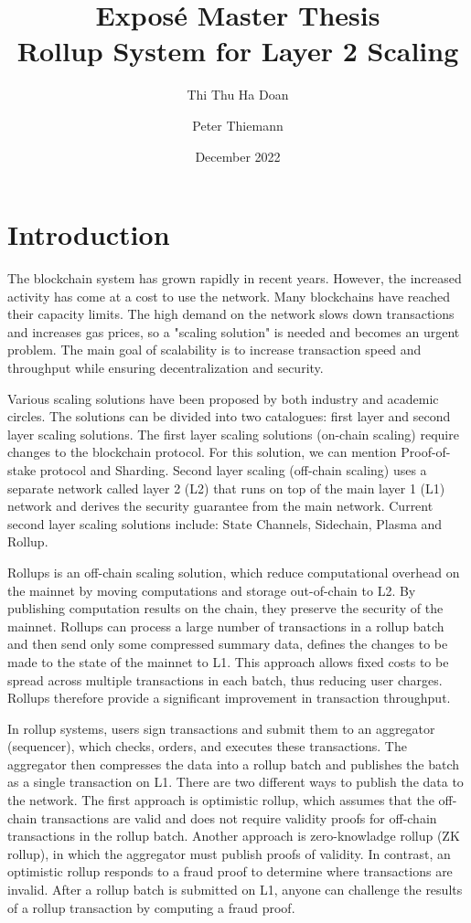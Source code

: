 \documentclass{article}
\title{Expos\'{e} Master Thesis\\
  Rollup System for Layer 2 Scaling}
\author{Thi Thu Ha Doan \and  Peter Thiemann}
\date{December 2022}
\begin{document}
\maketitle

\section{Introduction}
The blockchain system has grown rapidly in recent years. However, the increased activity has come at a cost to use the network. Many blockchains have reached their capacity limits. The high demand on the network slows down transactions and increases gas prices, so a "scaling solution" is needed and becomes an urgent problem. The main goal of scalability is to increase transaction speed and throughput while ensuring decentralization and security.

Various scaling solutions have been proposed by both industry and academic circles. The solutions can be divided into two catalogues: first layer and second layer scaling solutions. The first layer scaling solutions (on-chain scaling) require changes to the blockchain protocol. For this solution, we can mention Proof-of-stake protocol and Sharding. Second layer scaling (off-chain scaling)  uses a separate network called layer 2 (L2) that runs on top of the main layer 1 (L1) network and derives the security guarantee from the main network. Current second layer scaling solutions include: State Channels, Sidechain, Plasma and Rollup.

Rollups is an off-chain scaling solution, which reduce computational overhead on the mainnet by moving computations and storage out-of-chain to L2. By publishing computation results on the chain, they preserve the security of the mainnet. Rollups can process a large number of transactions in a rollup batch and then send only some compressed summary data, defines the changes to be made to the state of the mainnet  to L1. This approach allows fixed costs to be spread across multiple transactions in each batch, thus reducing user charges. Rollups therefore provide a significant improvement in transaction throughput. 

In rollup systems, users sign transactions and submit them to an aggregator (sequencer), which checks, orders, and executes these transactions. The aggregator then compresses the data into a rollup batch and publishes the batch as a single transaction on L1. There are two different ways to publish the data to the network. The first approach is optimistic rollup, which assumes that the off-chain transactions are valid and does not require validity proofs for off-chain transactions in the rollup batch. Another approach is zero-knowladge rollup (ZK rollup), in which the aggregator must publish proofs of validity. In contrast, an optimistic rollup responds to a fraud proof to determine where transactions are invalid. After a rollup batch is submitted on L1, anyone can challenge the results of a rollup transaction by computing a fraud proof.
\end{document}
